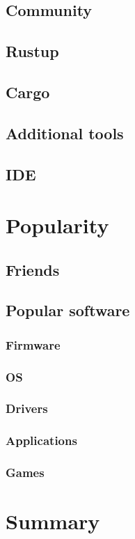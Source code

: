 \documentclass[%
final,
xcolor = table,
usenames,
dvipsnames,
table,
aspectratio = 169]{beamer}
\begin{document}
\subsection{Community}


\subsection{Rustup}

\subsection{Cargo}


\subsection{Additional tools}


\subsection{IDE}


\section{Popularity}

\subsection{Friends}

\subsection{Popular software}

\subsubsection{Firmware}

\subsubsection{OS}

\subsubsection{Drivers}

\subsubsection{Applications}


\subsubsection{Games}


\section{Summary}


\appendix


\end{document}
